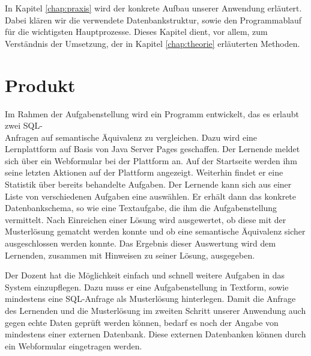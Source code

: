 In Kapitel \ref{chap:praxis} wird der konkrete Aufbau unserer Anwendung erläutert. Dabei klären wir die verwendete Datenbankstruktur, sowie den Programmablauf für die wichtigsten Hauptprozesse. Dieses Kapitel dient, vor allem, zum Verständnis der Umsetzung, der in Kapitel \ref{chap:theorie} erläuterten Methoden.

\section{Produkt}

Im Rahmen der Aufgabenstellung wird ein Programm entwickelt, das es erlaubt zwei SQL-\\Anfragen auf semantische Äquivalenz zu vergleichen. Dazu wird eine Lernplattform auf Basis von Java Server Pages geschaffen. Der Lernende meldet sich über ein Webformular bei der Plattform an. Auf der Startseite werden ihm seine letzten Aktionen auf der Plattform angezeigt. Weiterhin findet er eine Statistik über bereits behandelte Aufgaben. Der Lernende kann sich aus einer Liste von verschiedenen Aufgaben eine auswählen. Er erhält dann das konkrete Datenbankschema, so wie eine Textaufgabe, die ihm die Aufgabenstellung vermittelt. Nach Einreichen einer Lösung wird ausgewertet, ob diese mit der Musterlösung gematcht werden konnte und ob eine semantische Äquivalenz sicher ausgeschlossen werden konnte. Das Ergebnis dieser Auswertung wird dem Lernenden, zusammen mit Hinweisen zu seiner Lösung, ausgegeben.

Der Dozent hat die Möglichkeit einfach und schnell weitere Aufgaben in das System einzupflegen. Dazu muss er eine Aufgabenstellung in Textform, sowie mindestens eine SQL-Anfrage als Musterlösung hinterlegen. Damit die Anfrage des Lernenden und die Musterlösung im zweiten Schritt unserer Anwendung auch gegen echte Daten geprüft werden können, bedarf es noch der Angabe von mindestens einer externen Datenbank. Diese externen Datenbanken können durch ein Webformular eingetragen werden.

